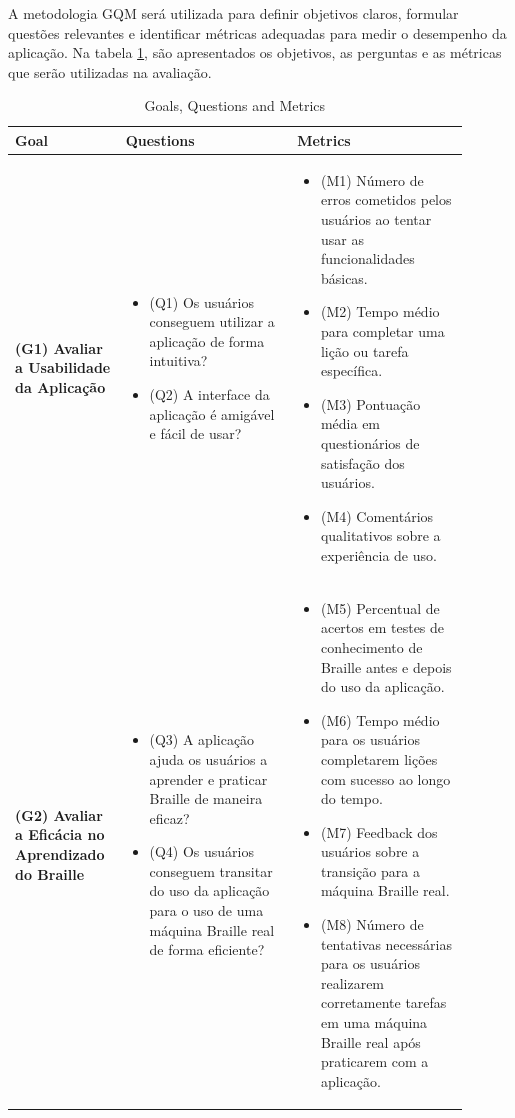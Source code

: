 A metodologia GQM será utilizada para definir objetivos claros, formular questões relevantes e identificar métricas adequadas para medir o desempenho da aplicação. Na tabela \ref{tab:GQM}, são apresentados os objetivos, as perguntas e as métricas que serão utilizadas na avaliação.

\begin{table}[h]
    \caption{Goals, Questions and Metrics}
    \label{tab:GQM}
    \centering
    \begin{tabular}{|p{0.2\linewidth}|p{0.35\linewidth}|p{0.35\linewidth}|} \hline 
         \textbf{Goal} & \textbf{Questions} & \textbf{Metrics} \\ \hline
        \textbf{(G1) Avaliar a Usabilidade da Aplicação} & 
        \begin{itemize}
            \item (Q1) Os usuários conseguem utilizar a aplicação de forma intuitiva?
            \item (Q2) A interface da aplicação é amigável e fácil de usar?
        \end{itemize} & 
        \begin{itemize}
            \item (M1) Número de erros cometidos pelos usuários ao tentar usar as funcionalidades básicas.
            \item (M2) Tempo médio para completar uma lição ou tarefa específica.
            \item (M3) Pontuação média em questionários de satisfação dos usuários.
            \item (M4) Comentários qualitativos sobre a experiência de uso.
        \end{itemize} \\ \hline
        
        \textbf{(G2) Avaliar a Eficácia no Aprendizado do Braille} & 
        \begin{itemize}
            \item (Q3) A aplicação ajuda os usuários a aprender e praticar Braille de maneira eficaz?
            \item (Q4) Os usuários conseguem transitar do uso da aplicação para o uso de uma máquina Braille real de forma eficiente?
        \end{itemize} & 
        \begin{itemize}
            \item (M5) Percentual de acertos em testes de conhecimento de Braille antes e depois do uso da aplicação.
            \item (M6) Tempo médio para os usuários completarem lições com sucesso ao longo do tempo.
            \item (M7) Feedback dos usuários sobre a transição para a máquina Braille real.
            \item (M8) Número de tentativas necessárias para os usuários realizarem corretamente tarefas em uma máquina Braille real após praticarem com a aplicação.
        \end{itemize} \\ \hline
        

\end{tabular}
\end{table}
